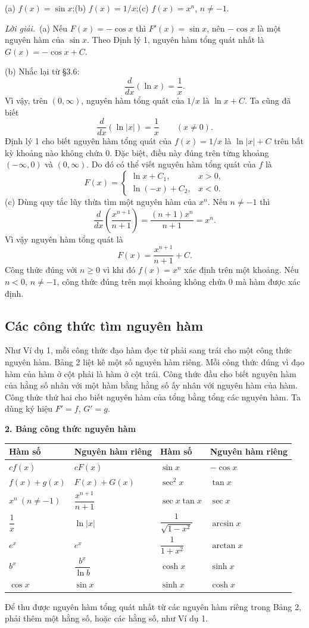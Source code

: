 \documentclass[12pt,a4paper]{article}
\newcommand{\sol}{\par\nopagebreak[4]\noindent\textit{Lời giải.}\ }
\newcommand{\group}[1]{\par\medskip\noindent\textbf{#1}\par\nopagebreak[4]}
\begin{document}
(a) $f(x)=\sin x$;\quad (b) $f(x)=1/x$;\quad (c) $f(x)=x^n$, $n\ne-1$.
\sol (a) Nếu $F(x)=-\cos x$ thì $F'(x)=\sin x$, nên $-\cos x$ là một nguyên hàm của $\sin x$. Theo Định lý 1, nguyên hàm tổng quát nhất là $G(x)=-\cos x+C$.

(b) Nhắc lại từ §3.6:
\[\frac d{dx}(\ln x)=\frac1x.\]
Vì vậy, trên $(0,\infty)$, nguyên hàm tổng quát của $1/x$ là $\ln x+C$. Ta cũng đã biết
\[\frac d{dx}(\ln|x|)=\frac1x\qquad(x\ne0).\]
Định lý 1 cho biết nguyên hàm tổng quát của $f(x)=1/x$ là $\ln|x|+C$ trên bất kỳ khoảng nào không chứa $0$. Đặc biệt, điều này đúng trên từng khoảng $(-\infty,0)$ và $(0,\infty)$. Do đó có thể viết nguyên hàm tổng quát của $f$ là
\[F(x)=\begin{cases}\ln x+C_1,&x>0,\\\ln(-x)+C_2,&x<0.\end{cases}\]
(c) Dùng quy tắc lũy thừa tìm một nguyên hàm của $x^n$. Nếu $n\ne-1$ thì
\[\frac d{dx}\left(\frac{x^{n+1}}{n+1}\right)=\frac{(n+1)x^n}{n+1}=x^n.\]
Vì vậy nguyên hàm tổng quát là
\[F(x)=\frac{x^{n+1}}{n+1}+C.\]
Công thức đúng với $n\ge0$ vì khi đó $f(x)=x^n$ xác định trên một khoảng. Nếu $n<0$, $n\ne-1$, công thức đúng trên mọi khoảng không chứa $0$ mà hàm được xác định.

\subsection*{Các công thức tìm nguyên hàm}
Như Ví dụ 1, mỗi công thức đạo hàm đọc từ phải sang trái cho một công thức nguyên hàm. Bảng 2 liệt kê một số nguyên hàm riêng. Mỗi công thức đúng vì đạo hàm của hàm ở cột phải là hàm ở cột trái. Công thức đầu cho biết nguyên hàm của hằng số nhân với một hàm bằng hằng số ấy nhân với nguyên hàm của hàm. Công thức thứ hai cho biết nguyên hàm của tổng bằng tổng các nguyên hàm. Ta dùng ký hiệu $F'=f$, $G'=g$.
\group{2. Bảng công thức nguyên hàm}
\begin{center}\renewcommand{\arraystretch}{2.0}
\begin{tabular}{llll}\toprule
Hàm số&Nguyên hàm riêng&Hàm số&Nguyên hàm riêng\\\midrule
$cf(x)$&$cF(x)$&$\sin x$&$-\cos x$\\
$f(x)+g(x)$&$F(x)+G(x)$&$\sec^2x$&$\tan x$\\
$x^n\ (n\ne-1)$&$\dfrac{x^{n+1}}{n+1}$&$\sec x\tan x$&$\sec x$\\
$\dfrac1x$&$\ln|x|$&$\dfrac1{\sqrt{1-x^2}}$&$\arcsin x$\\
$e^x$&$e^x$&$\dfrac1{1+x^2}$&$\arctan x$\\
$b^x$&$\dfrac{b^x}{\ln b}$&$\cosh x$&$\sinh x$\\
$\cos x$&$\sin x$&$\sinh x$&$\cosh x$\\\bottomrule
\end{tabular}\end{center}
Để thu được nguyên hàm tổng quát nhất từ các nguyên hàm riêng trong Bảng 2, phải thêm một hằng số, hoặc các hằng số, như Ví dụ 1.
\end{document}
